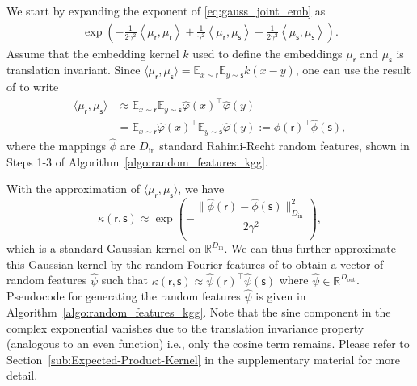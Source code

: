 \documentclass[english]{article}
\theoremstyle{plain}
\theoremstyle{plain}
\newcommand{\secref}[1]{Section~\ref{#1}}
\begin{document}
We start by expanding the  exponent 
of \eqref{eq:gauss_joint_emb} as
%
\begin{align*}
  \exp\left(-\frac{1}{2\gamma^{2}}\left\langle \mu_{\mathsf{r}},\mu_{\mathsf{r}}\right\rangle +\frac{1}{\gamma^{2}}\left\langle \mu_{\mathsf{r}},\mu_{\mathsf{s}}\right\rangle -\frac{1}{2\gamma^{2}}\left\langle \mu_{\mathsf{s}},\mu_{\mathsf{s}}\right\rangle \right).
\end{align*}
%
Assume that the embedding kernel $k$ used to define the embeddings $\mu_\mathsf{r}$ 
and $\mu_\mathsf{s}$ is translation invariant. Since 
$\langle \mu_{\mathsf{r}},\mu_{\mathsf{s}}  \rangle
= \mathbb{E}_{x \sim \mathsf{r}} \mathbb{E}_{y \sim \mathsf{s}} k(x-y)$, one can use 
the result of \cite{Rahimi2007} to write
%
\begin{align*}
 \langle \mu_{\mathsf{r}},\mu_{\mathsf{s}}  \rangle
 & \approx \mathbb{E}_{x \sim \mathsf{r}} \mathbb{E}_{y \sim \mathsf{s}} 
   \hat{\varphi}(x)^\top \hat{\varphi}(y) \nonumber \\ 
 & = \mathbb{E}_{x \sim \mathsf{r}} 
   \hat{\varphi}(x)^\top \mathbb{E}_{y \sim \mathsf{s}}  \hat{\varphi}(y) 
 := \hat{\phi}(\mathsf{r})^\top \hat{\phi}(\mathsf{s}),
\end{align*}
%
where the mappings $\hat{\phi}$ are $D_\mathrm{in}$ standard Rahimi-Recht random features, shown in Steps 1-3 of Algorithm~\ref{algo:random_features_kgg}.

With the approximation of $\langle \mu_{\mathsf{r}},\mu_{\mathsf{s}}  \rangle$,
we have
\begin{equation}
\kappa(\mathsf{r}, \mathsf{s})\approx\exp\left(-\frac{\|\hat{\phi}(\mathsf{r})-\hat{\phi}(\mathsf{s})\|_{D_\mathrm{in}}^{2}}{2\gamma^{2}}\right),
%
\end{equation}
which is a standard Gaussian kernel on $\mathbb{R}^{D_\mathrm{in}}$.
We can thus further approximate this Gaussian kernel 
%
%
by the random Fourier features of \citeauthor{Rahimi2007} to obtain a vector 
of random features $\hat{\psi}$ such that 
$\kappa(\mathsf{r}, \mathsf{s}) \approx \hat{\psi}(\mathsf{r})^\top \hat{\psi}(\mathsf{s})$
where $\hat{\psi} \in \mathbb{R}^{D_\mathrm{out}}$. 
Pseudocode for generating the random features $\hat{\psi}$ is given in
Algorithm~\ref{algo:random_features_kgg}. 
Note that the sine component in the complex exponential vanishes due to the
translation invariance property (analogous to an even function) i.e.,  only 
the cosine term remains.
Please refer to \secref{sub:Expected-Product-Kernel} in the supplementary material for more detail.
\end{document}
